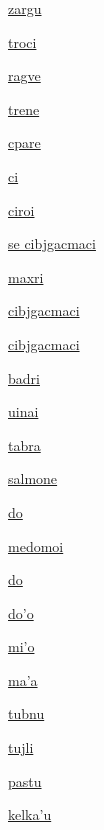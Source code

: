 {\hyperlink{val:zargu}{zargu}}{}{}{}

{\hyperlink{val:troci}{troci}}{}{}{}

{\hyperlink{val:ragve}{ragve}}{}{}{}

{\hyperlink{val:trene}{trene}}{}{}{}

{\hyperlink{val:cpare}{cpare}}{}{}{}

{\hyperlink{val:ci}{ci}}{}{}{}

{\hyperlink{val:ciroi}{ciroi}}{}{}{}

{\hyperlink{val:cibjgacmaci}{se cibjgacmaci}}{}{}{}

{\hyperlink{val:maxri}{maxri}}{}{}{}

{\hyperlink{val:cibjgacmaci}{cibjgacmaci}}{}{}{}

{\hyperlink{val:cibjgacmaci}{cibjgacmaci}}{}{}{}

{\hyperlink{val:badri}{badri}}{}{}{}

{\hyperlink{val:uinai}{uinai}}{}{}{}

{\hyperlink{val:tabra}{tabra}}{}{}{}

{\hyperlink{val:salmone}{salmone}}{}{}{}

{\hyperlink{val:do}{do}}{}{}{}

{\hyperlink{val:medomoi}{medomoi}}{}{}{}

{\hyperlink{val:do}{do}}{}{}{}

{\hyperlink{val:doho}{do'o}}{}{}{}

{\hyperlink{val:miho}{mi'o}}{}{}{}

{\hyperlink{val:maha}{ma'a}}{}{}{}

{\hyperlink{val:tubnu}{tubnu}}{}{}{}

{\hyperlink{val:tujli}{tujli}}{}{}{}

{\hyperlink{val:pastu}{pastu}}{}{}{}

{\hyperlink{val:kelkahu}{kelka'u}}{}{}{}

